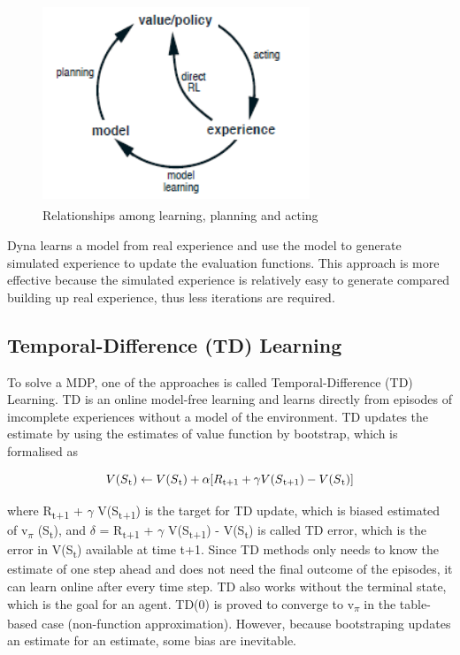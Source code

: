 \documentclass[12pt,twoside]{report}
\begin{document}
\begin{figure}[!htb]
\centering
\includegraphics[width=8cm, height=6cm]{./figures/dyna}
\caption{Relationships among learning, planning and acting}
\label{dyna}
\end{figure}

Dyna learns a model from real experience and use the model to generate simulated experience to update the evaluation functions.
This approach is more effective because the simulated experience is relatively easy to generate compared building up real experience, thus less iterations are required.

\subsection{Temporal-Difference (TD) Learning}
\label{td_learning_section}

To solve a MDP, one of the approaches is called Temporal-Difference (TD) Learning.
TD is an online model-free learning and learns directly from episodes of imcomplete experiences without a model of the environment.
TD updates the estimate by using the estimates of value function by bootstrap, which is formalised as

\begin{equation}
\centering
V(S\textsubscript{t}) \leftarrow V(S\textsubscript{t}) + \alpha[R\textsubscript{t+1} + \gamma V(S\textsubscript{t+1}) - V(S\textsubscript{t})]
\end{equation}

where R\textsubscript{t+1} + $\gamma$ V(S\textsubscript{t+1}) is the target for TD update, which is biased estimated of v\textsubscript{$\pi$} (S\textsubscript{t}), and $\delta$ = R\textsubscript{t+1} + $\gamma$ V(S\textsubscript{t+1}) - V(S\textsubscript{t}) is called TD error, which is the error in V(S\textsubscript{t}) available at time t+1.
Since TD methods only needs to know the estimate of one step ahead and does not need the final outcome of the episodes, it can learn online after every time step. TD also works without the terminal state, which is the goal for an agent.
TD(0) is proved to converge to v\textsubscript{$\pi$} in the table-based case (non-function approximation).
However, because bootstraping updates an estimate for an estimate, some bias are inevitable. 
\end{document}
